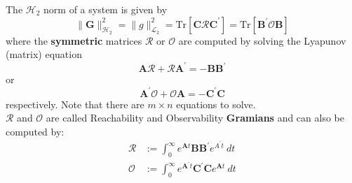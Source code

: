 The $\mathcal{H}_2$ norm of a system is given by
\begin{equation*}
    \|\mathbf{G}\|_{\mathcal{H}_2}^2=\|g\|_{\mathcal{L}_2}^2=\mathrm{Tr}\left[\mathbf{C\mathcal{R}C}^{\prime}\right]=\mathrm{Tr}\left[\mathbf{B^{\prime}\mathcal{O}B}\right]
\end{equation*}
where the \textbf{symmetric} matrices $\mathbf{\mathcal{R}}$ or $\mathbf{\mathcal{O}}$ are computed by solving the Lyapunov (matrix) equation
\begin{equation*}
    \mathbf{ A\mathcal{R}}+\mathbf{\mathcal{R}A}^{\prime}=-\mathbf{BB}^{\prime}
\end{equation*}
or\begin{equation*}
    \mathbf{A^{\prime}\mathcal{O}}+\mathbf{\mathcal{O}A}=-\mathbf{C^{\prime}C}
\end{equation*}
respectively. Note that there are $m\times n$ equations to solve.\\
$\mathbf{\mathcal{R}}$ and $\mathbf{\mathcal{O}}$ are called Reachability and Observability \textbf{Gramians} and can also be computed by:
\begin{align*}
    \mathbf{\mathcal{R}} & :=\int_{0}^{\infty}e^{\mathbf{A}t}\mathbf{BB}^{\prime}e^{A^{\prime}t}\mathrm{~}dt          \\
    \mathbf{\mathcal{O}} & :=\int_{0}^{\infty}e^{\mathbf{A}^{\prime}t}\mathbf{C^{\prime}C}e^{\mathbf{A}t}\mathrm{~}dt
\end{align*}


